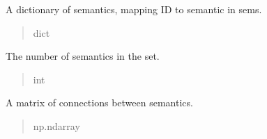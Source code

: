\documentclass[letterpaper,10pt,english]{sphinxmanual}
\begin{document}
\begin{fulllineitems}
\begin{fulllineitems}
\begin{quote}
\begin{description}
\end{description}\end{quote}

\end{fulllineitems}


\begin{fulllineitems}
\label{\detokenize{nodes:nodes.nodeBuilder.Sem_set.id_dict}}
\pysigstartsignatures
\pysigline
{}
\pysigstopsignatures
\sphinxAtStartPar
A dictionary of semantics, mapping ID to semantic in sems.
\begin{quote}\begin{description}
\sphinxAtStartPar
dict

\end{description}\end{quote}

\end{fulllineitems}


\begin{fulllineitems}
\label{\detokenize{nodes:nodes.nodeBuilder.Sem_set.num_sems}}
\pysigstartsignatures
\pysigline
{}
\pysigstopsignatures
\sphinxAtStartPar
The number of semantics in the set.
\begin{quote}\begin{description}
\sphinxAtStartPar
int

\end{description}\end{quote}

\end{fulllineitems}


\begin{fulllineitems}
\label{\detokenize{nodes:nodes.nodeBuilder.Sem_set.connections}}
\pysigstartsignatures
\pysigline
{}
\pysigstopsignatures
\sphinxAtStartPar
A matrix of connections between semantics.
\begin{quote}\begin{description}
\sphinxAtStartPar
np.ndarray


\end{description}
\end{quote}
\end{fulllineitems}
\end{fulllineitems}
\end{document}
